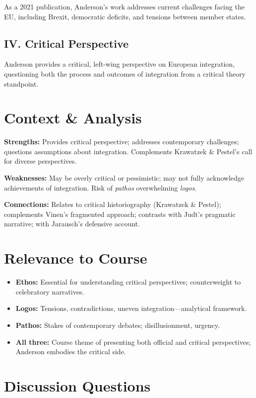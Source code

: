 \documentclass[11pt,a4paper]{article}
\begin{document}
As a 2021 publication, Anderson's work addresses current challenges facing the EU, including Brexit, democratic deficits, and tensions between member states.

\subsection*{IV. Critical Perspective}

Anderson provides a critical, left-wing perspective on European integration, questioning both the process and outcomes of integration from a critical theory standpoint.

\section*{Context \& Analysis}

\textbf{Strengths:} Provides critical perspective; addresses contemporary challenges; questions assumptions about integration. Complements Krawatzek \& Pestel's call for diverse perspectives.

\textbf{Weaknesses:} May be overly critical or pessimistic; may not fully acknowledge achievements of integration. Risk of \textit{pathos} overwhelming \textit{logos}.

\textbf{Connections:} Relates to critical historiography (Krawatzek \& Pestel); complements Vinen's fragmented approach; contrasts with Judt's pragmatic narrative; with Jarausch's defensive account.

\section*{Relevance to Course}

\begin{itemize}
\item \textbf{Ethos:} Essential for understanding critical perspectives; counterweight to celebratory narratives.
\item \textbf{Logos:} Tensions, contradictions, uneven integration---analytical framework.
\item \textbf{Pathos:} Stakes of contemporary debates; disillusionment, urgency.
\item \textbf{All three:} Course theme of presenting both official and critical perspectives; Anderson embodies the critical side.
\end{itemize}

\section*{Discussion Questions}
\end{document}
